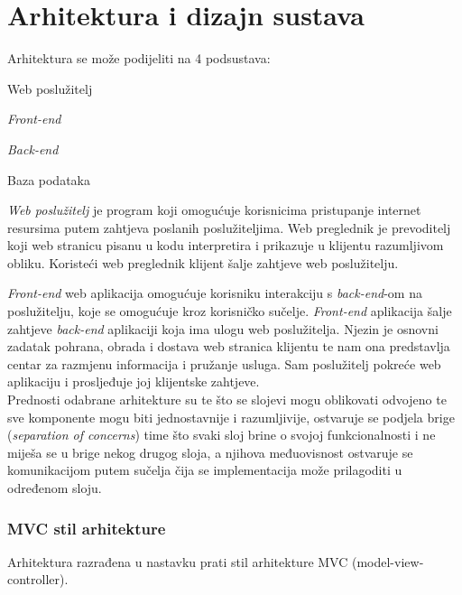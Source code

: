 \chapter{Arhitektura i dizajn sustava}
		
		Arhitektura se može podijeliti na 4 podsustava:
		\begin{packed_item}
		
			\item   Web poslužitelj
			\item   \textit{Front-end}
			\item 	\textit{Back-end}
			\item   Baza podataka
		\end{packed_item}
		
		
		\textit{Web poslužitelj} je program koji omogućuje korisnicima pristupanje internet resursima putem zahtjeva poslanih poslužiteljima. Web preglednik je prevoditelj koji web stranicu pisanu u kodu interpretira i prikazuje u klijentu razumljivom obliku. Koristeći web preglednik klijent šalje zahtjeve web poslužitelju.
		
		\textit{Front-end} web aplikacija omogućuje korisniku interakciju s \textit{back-end}-om na poslužitelju, koje se omogućuje kroz korisničko sučelje. 
		\textit{Front-end} aplikacija šalje zahtjeve \textit{back-end} aplikaciji koja ima ulogu web poslužitelja. Njezin je osnovni zadatak pohrana, obrada i dostava web stranica klijentu te nam ona predstavlja centar za razmjenu informacija i pružanje usluga. Sam poslužitelj pokreće web aplikaciju i prosljeđuje joj klijentske zahtjeve.\\

		Prednosti odabrane arhitekture su te što se slojevi mogu oblikovati odvojeno te sve komponente mogu biti jednostavnije i razumljivije, ostvaruje se podjela brige (\textit{separation of concerns}) time što svaki sloj brine o svojoj funkcionalnosti i ne miješa se u brige nekog drugog sloja, a njihova međuovisnost ostvaruje se komunikacijom putem sučelja čija se implementacija može prilagoditi u određenom sloju.\\

		\pagebreak

		\subsection{MVC stil arhitekture}
		Arhitektura razrađena u nastavku prati stil arhitekture MVC (model-view-controller).\\
		
